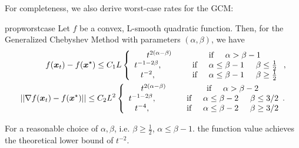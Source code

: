 \documentclass{article}
\begin{document}
For completeness, we also derive worst-case rates for the GCM:
\vspace{1.5 cm}

\begin{restatable}{prop}{worstcase}
Let $f$ be a convex, L-smooth quadratic function. Then, for the Generalized Chebyshev Method with parameters $(\alpha,\beta)$, we have
\begin{align}
 f({\boldsymbol x}_t)-f({\boldsymbol x}^\star) \leq C_1L\left\{
    \begin{array}{cc}
           t^{2(\alpha-\beta)} &\text{if} \hspace{0.5 cm} \alpha>\beta-1 \\
         t^{-1-2\beta}, \hspace{1 cm} &\text{if} \hspace{0.5 cm} \alpha\leq \beta-1\hspace{0.5 cm} \beta\leq \frac{1}{2}\\
         t^{-2}, \hspace{1 cm} &\text{if} \hspace{0.5 cm} \alpha\leq\beta-1\hspace{0.5 cm} \beta\geq \frac{1}{2} 
    \end{array}
    \right . ,\\
    ||\nabla f({\boldsymbol x}_t)-f({\boldsymbol x}^\star)||\leq C_2L^2\left\{
    \begin{array}{cc}
           t^{2(\alpha-\beta)} &\text{if} \hspace{0.5 cm} \alpha>\beta-2 \\
         t^{-1-2\beta}, \hspace{1 cm} &\text{if} \hspace{0.5 cm} \alpha\leq \beta-2\hspace{0.5 cm} \beta\leq 3/2\\
         t^{-4}, \hspace{1 cm} &\text{if} \hspace{0.5 cm} \alpha\leq\beta-2\hspace{0.5 cm} \beta\geq 3/2
    \end{array}.
    \right. 
\end{align}
\end{restatable}


For  a reasonable choice of $\alpha,\beta$, i.e. $\beta\geq \frac{1}{2}$, $\alpha\leq \beta-1$. the function value achieves the theoretical lower bound of $t^{-2}$.
\end{document}
